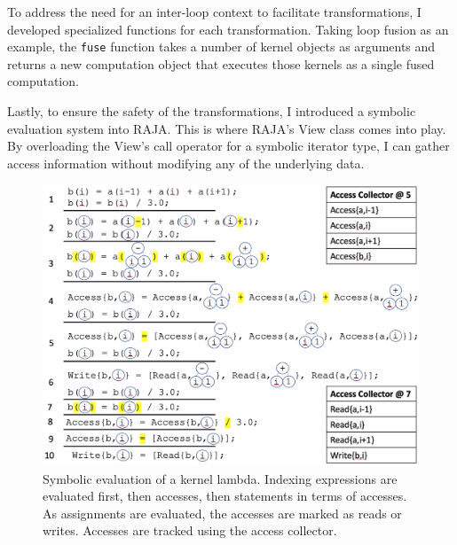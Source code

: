 \documentclass{article}
\begin{document}
To address the need for an inter-loop context to facilitate transformations, I developed specialized functions for each transformation. 
Taking loop fusion as an example, the \verb.fuse. function takes a number of kernel objects as arguments and returns a new computation object that executes those kernels as a single fused computation. 

Lastly, to ensure the safety of the transformations, I introduced a symbolic evaluation system into RAJA.
This is where RAJA's View class comes into play. 
By overloading the View's call operator for a symbolic iterator type, I can gather access information without modifying any of the underlying data. 


\begin{figure}
\includegraphics[width=\linewidth]{SymExecProcess.png}
\caption{Symbolic evaluation of a kernel lambda. 
Indexing expressions are evaluated first, then accesses, then statements in terms of accesses.
As assignments are evaluated, the accesses are marked as reads or writes.
Accesses are tracked using the access collector.}
\label{symExec}
\end{figure}
\end{document}
